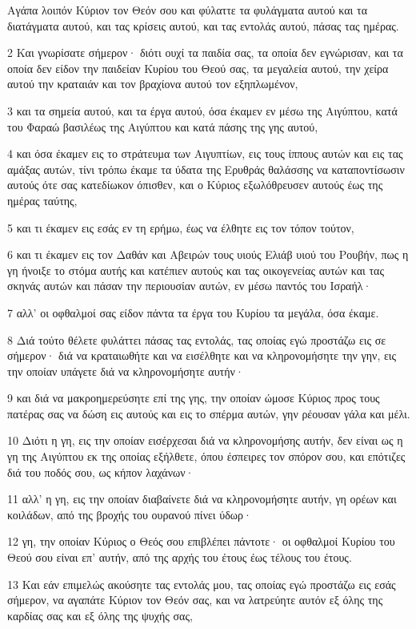 \par Αγάπα λοιπόν Κύριον τον Θεόν σου και φύλαττε τα φυλάγματα αυτού και τα διατάγματα αυτού, και τας κρίσεις αυτού, και τας εντολάς αυτού, πάσας τας ημέρας.
\par 2 Και γνωρίσατε σήμερον· διότι ουχί τα παιδία σας, τα οποία δεν εγνώρισαν, και τα οποία δεν είδον την παιδείαν Κυρίου του Θεού σας, τα μεγαλεία αυτού, την χείρα αυτού την κραταιάν και τον βραχίονα αυτού τον εξηπλωμένον,
\par 3 και τα σημεία αυτού, και τα έργα αυτού, όσα έκαμεν εν μέσω της Αιγύπτου, κατά του Φαραώ βασιλέως της Αιγύπτου και κατά πάσης της γης αυτού,
\par 4 και όσα έκαμεν εις το στράτευμα των Αιγυπτίων, εις τους ίππους αυτών και εις τας αμάξας αυτών, τίνι τρόπω έκαμε τα ύδατα της Ερυθράς θαλάσσης να καταποντίσωσιν αυτούς ότε σας κατεδίωκον όπισθεν, και ο Κύριος εξωλόθρευσεν αυτούς έως της ημέρας ταύτης,
\par 5 και τι έκαμεν εις εσάς εν τη ερήμω, έως να έλθητε εις τον τόπον τούτον,
\par 6 και τι έκαμεν εις τον Δαθάν και Αβειρών τους υιούς Ελιάβ υιού του Ρουβήν, πως η γη ήνοιξε το στόμα αυτής και κατέπιεν αυτούς και τας οικογενείας αυτών και τας σκηνάς αυτών και πάσαν την περιουσίαν αυτών, εν μέσω παντός του Ισραήλ·
\par 7 αλλ' οι οφθαλμοί σας είδον πάντα τα έργα του Κυρίου τα μεγάλα, όσα έκαμε.
\par 8 Διά τούτο θέλετε φυλάττει πάσας τας εντολάς, τας οποίας εγώ προστάζω εις σε σήμερον· διά να κραταιωθήτε και να εισέλθητε και να κληρονομήσητε την γην, εις την οποίαν υπάγετε διά να κληρονομήσητε αυτήν·
\par 9 και διά να μακροημερεύσητε επί της γης, την οποίαν ώμοσε Κύριος προς τους πατέρας σας να δώση εις αυτούς και εις το σπέρμα αυτών, γην ρέουσαν γάλα και μέλι.
\par 10 Διότι η γη, εις την οποίαν εισέρχεσαι διά να κληρονομήσης αυτήν, δεν είναι ως η γη της Αιγύπτου εκ της οποίας εξήλθετε, όπου έσπειρες τον σπόρον σου, και επότιζες διά του ποδός σου, ως κήπον λαχάνων·
\par 11 αλλ' η γη, εις την οποίαν διαβαίνετε διά να κληρονομήσητε αυτήν, γη ορέων και κοιλάδων, από της βροχής του ουρανού πίνει ύδωρ·
\par 12 γη, την οποίαν Κύριος ο Θεός σου επιβλέπει πάντοτε· οι οφθαλμοί Κυρίου του Θεού σου είναι επ' αυτήν, από της αρχής του έτους έως τέλους του έτους.
\par 13 Και εάν επιμελώς ακούσητε τας εντολάς μου, τας οποίας εγώ προστάζω εις εσάς σήμερον, να αγαπάτε Κύριον τον Θεόν σας, και να λατρεύητε αυτόν εξ όλης της καρδίας σας και εξ όλης της ψυχής σας,
